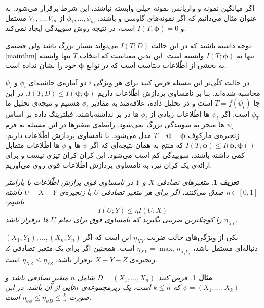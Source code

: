 \documentclass[a4paper,12pt]{article}
\newtheorem{den}{{\large\bf تعریف}}[section]
\newtheorem{exa}{{\large\bf مثال}}[section]
\newcommand{\bfphi}{\bm {\phi}}
\begin{document}
	اگر میانگین نمونه و واریانس نمونه خیلی وابسته نباشند، این شرط برقرار می‌شود. به عنوان مثال می‌دانیم که اگر نمونه‌های گاوسی و 
	باشند، 
	$\phi_1, \dots, \phi_m$
	از 
	$V_1,\dots, V_m$
	مستقل  و 
	$I(T; \bfphi) = 0$
	است، در نتیجه  روش سوییدگی ایجاد نمی‌کند.
	
	توجه داشته باشید که در این حالت
	$I(T; D)$
	می‌تواند بسیار بزرگ باشد ولی قضیه‌ی 
	\eqref{mainthm}
	تنها به 
	$I(T; \bfphi)$
	وابسته است. این بدین معناست که انتخاب $T$ تنها وابسته به بخشی از اطّلاعات دیتاست است که در توابع
	$\bfphi$
	خود را نشان نداده است.
	
	در حالت کلّی‌تر این مسئله فرض کنید برای هر ویژگی 
	$i$
	دو آماره‌ی حاشیه‌ای
	$\phi_i$
	و
	$\psi_i$
	محاسبه شده‌اند. بنا بر نامساوی پردازش اطّلاعات داریم
	$I(T; D) \leq I (\mathbf{\psi}; \bfphi)$.
	در این جا 
	$T  = f(\psi_i)$
	است و در تحلیل داده‌، علاقه‌مند به مقادیر
	$\phi_i$
	هستیم و نتیجه‌ی تحلیل ما 
	$\phi_T$
	است.    اگر 
	$\psi_i$
	ها اطّلاعات زیادی از 
	$\phi_i$
	ها در بر نداشته‌باشند، فیلترینگ داده بر اساس‌
	$\psi_i$
	ها منجر به سوییدگی بزرگ نمی‌شود. رابطه‌ی متغیر‌ها در این مسئله به فرم زنجیره‌ی مارکوف
	$T - \mathbf{\psi} - \bfphi$
	مدل می‌شود. با نامساوی پردازش اطّلاعات داریم:
	$I(T; \bfphi) \leq I(\bfphi, \mathbf{\psi}()$
	که منتج به همان نتیجه‌ای که اگر
	$\psi$
	ها و 
	$\phi$
	ها اطّلاعات متقابل کمی داشته باشند، سوییدگی کم است می‌شود. این کران کران تیزی نیست و برای ارائه‌ی یک کران تیز، به نامساوی پردازش اطّلاعات قوی روی‌ می‌آوریم.
	
	\begin{den}
		متغیر‌های تصادفی 
		$X$
		و
		$Y$
		در نامساوی قوی پرازش اطّلاعات با پارامتر 
		$\eta \in [0, 1]$
		صدق می‌کنند، اگر برای هر متغیر تصادفی $U$ با زنجیره‌ی 
		$U-X-Y$
		داشته باشیم:
		$$I(U; Y) \leq \eta I(U;X)$$
		$\eta_{XY}$
		را کوچکترین ضریبی بگیرید که نامساوی فوق برای تمام $U$ ها برقرار باشد.
	\end{den}
	
	یکی از ویژگی‌های جالب ضریب 
	$\eta_{XY}$
	این است که اگر
	$(X_1, Y_1), \dots, (X_n, Y_n)$
	دنباله‌ای مستقل باشد، 
	$\eta_{XY} = \max_i \eta_{X_i Y_i}$
	است. همچنین اگر برای یک متغیر تصادفی 
	$Z$
	زنجیره‌ی 
	$X-Y-Z$
	برقرار باشد،
	$\eta_{XZ} \leq \eta_{YZ}$
	است.
	
	
	\begin{exa}
		فرض کنید 
		$D = (X_1, \dots, X_n)$
		شامل $n$ متغیر تصادفی 
		باشد و 
		$\psi = (X_1, \dots, X_k)$
		که 
		$k \leq n$
		است، یک زیرمجموعه‌ی $n$تایی از آن باشد. در این صورت 
		$\eta_{\psi\phi} \leq \eta_{\psi D} \leq \frac{k}{n}$
		است.
	\end{exa}
	
\end{document}
